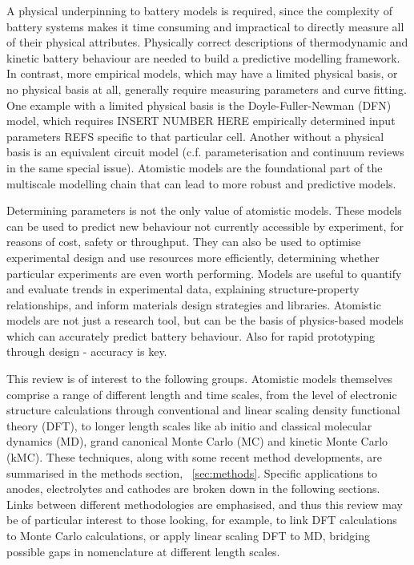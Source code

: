 \documentclass[../main.tex]{subfiles}
\begin{document}
 A physical underpinning to battery models is required, since the complexity of battery systems makes it time consuming and impractical to directly measure all of their physical attributes. Physically correct descriptions of thermodynamic and kinetic battery behaviour are needed to build a predictive modelling framework. In contrast, more empirical models, which may have a limited physical basis, or no physical basis at all, generally require measuring parameters and curve fitting. One example with a limited physical basis is the Doyle-Fuller-Newman (DFN) model, which requires INSERT NUMBER HERE empirically determined input parameters REFS specific to that particular cell. Another without a physical basis is an equivalent circuit model (c.f. parameterisation and continuum reviews in the same special issue). Atomistic models are the foundational part of the multiscale modelling chain that can lead to more robust and predictive models.
 
Determining parameters is not the only value of atomistic models. These models can be used to predict new behaviour not currently accessible by experiment, for reasons of cost, safety or throughput. They can also be used to optimise experimental design and use resources more efficiently, determining whether particular experiments are even worth performing. Models are useful to quantify and evaluate trends in experimental data, explaining structure-property relationships, and inform materials design strategies and libraries. Atomistic models are not just a research tool, but can be the basis of physics-based models which can accurately predict battery behaviour. Also for rapid prototyping through design - accuracy is key.

This review is of interest to the following groups. Atomistic models themselves comprise a range of different length and time scales, from the level of electronic structure calculations through conventional and linear scaling density functional theory (DFT), to longer length scales like ab initio and classical molecular dynamics (MD), grand canonical Monte Carlo (MC) and kinetic Monte Carlo (kMC). These techniques, along with some recent method developments, are summarised in the methods section, ~\ref{sec:methods}. Specific applications to anodes, electrolytes and cathodes are broken down in the following sections. Links between different methodologies are emphasised, and thus this review may be of particular interest to those looking, for example, to link DFT calculations to Monte Carlo calculations, or apply linear scaling DFT to MD, bridging possible gaps in nomenclature at different length scales.
\end{document}
